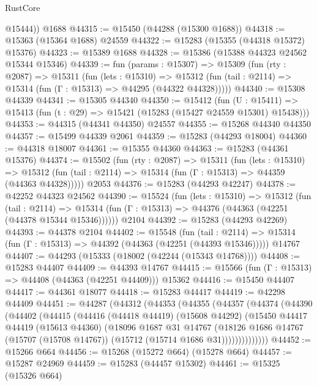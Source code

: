 \begin{lexlean}{RustCore}
\begin{coremodule}
        @15444))
    @1688
@44315 := @15450 (@44288 (@15300 @1688))
@44318 := @15363 (@15364 @1688) @24559
@44322 := @15283 (@15355 (@44318 @15372) @15376)
@44323 := @15389 @1688
@44328 := @15386 (@15388 @44323 @24562 @15344 @15346)
@44339 := fun (params : @15307) =>
  @15309
    (fun (rty : @2087) =>
    @15311
      (fun (lets : @15310) =>
      @15312 (fun (tail : @2114) => @15314 (fun (Γ : @15313) => @44295 (@44322 @44328)))))
@44340 := @15308 @44339
@44341 := @15305 @44340
@44350 := @15412
    (fun (U : @15411) => @15413 (fun (t : @29) => @15421 (@15283 (@15427 @24559 @15301) @15438)))
@44353 := @44315 (@44341 @44350) @24557
@44355 := @15268 @44340 @44350
@44357 := @15499 @44339 @2061
@44359 := @15283 (@44293 @18004)
@44360 := @44318 @18007
@44361 := @15355 @44360
@44363 := @15283 (@44361 @15376)
@44374 := @15502
    (fun (rty : @2087) =>
    @15311
      (fun (lets : @15310) =>
      @15312 (fun (tail : @2114) => @15314 (fun (Γ : @15313) => @44359 (@44363 @44328)))))
    @2053
@44376 := @15283 (@44293 @42247)
@44378 := @42252 @44323 @24562
@44390 := @15524
    (fun (lets : @15310) =>
    @15312
      (fun (tail : @2114) =>
      @15314 (fun (Γ : @15313) => @44376 (@44363 (@42251 (@44378 @15344 @15346))))))
    @2104
@44392 := @15283 (@44293 @42269)
@44393 := @44378 @2104
@44402 := @15548
    (fun (tail : @2114) => @15314 (fun (Γ : @15313) => @44392 (@44363 (@42251 (@44393 @15346)))))
    @14767
@44407 := @44293 (@15333 (@18002 (@42244 (@15343 @14768))))
@44408 := @15283 @44407
@44409 := @44393 @14767
@44415 := @15566 (fun (Γ : @15313) => @44408 (@44363 (@42251 @44409))) @15362
@44416 := @15450 @44407
@44417 := @44361 @18077
@44418 := @15283 @44417
@44419 := @42298 @44409
@44451 := @44287
    (@44312
      (@44353
        (@44355
          (@44357
            (@44374
              (@44390
                (@44402
                  (@44415
                    (@44416
                      (@44418 @44419)
                      (@15608 @44292)
                      (@15450
                        @44417
                        @44419
                        (@15613 @44360)
                        (@18096
                          @1687
                          @31
                          @14767
                          (@18126
                            @1686
                            @14767
                            (@15707 (@15708 @14767))
                            (@15712 (@15714 @1686 @31))))))))))))))
@44452 := @15266 @664
@44456 := @15268 (@15272 @664) (@15278 @664)
@44457 := @15287 @24969
@44459 := @15283 (@44457 @15302)
@44461 := @15325 (@15326 @664)

\end{coremodule}
\end{lexlean}

